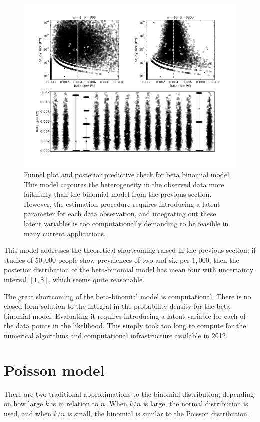 \begin{figure}[ht]
\begin{center}
\includegraphics[width=\textwidth]{beta-binomial-funnel.pdf}
\end{center}
\caption{Funnel plot and posterior predictive check for beta binomial
  model. This model captures the heterogeneity in the observed data
  more faithfully than the binomial model from the previous section.
  However, the estimation procedure requires introducing a latent
  parameter for each data observation, and integrating out these
  latent variables is too computationally demanding to be feasible in
  many current applications.}
\label{rate-model-beta-binomial-funnel}
\end{figure}

This model addresses the theoretical shortcoming raised in the
previous section: if studies of $50,000$ people show prevalences of
two and six per $1,000$, then the posterior distribution of the
beta-binomial model has mean four with uncertainty interval $[1,8]$,
which seems quite reasonable.

The great shortcoming of the beta-binomial model is computational.
There is no closed-form solution to the integral in the probability
density for the beta binomial model.  Evaluating it requires
introducing a latent variable for each of the data points in the
likelihood.  This simply took too long to compute for the numerical
algorithms and computational infrastructure available in 2012.

\section{Poisson model}
There are two traditional approximations to the binomial distribution,
depending on how large $k$ is in relation to $n$.  When $k/n$ is
large, the normal distribution is used, and when $k/n$ is small, the
binomial is similar to the Poisson distribution.

